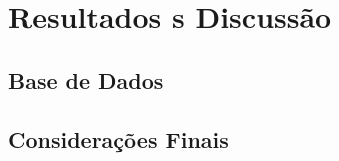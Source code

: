\chapter{Resultados s Discussão}\label{cap:resultados}

\lipsum[73]

\section{Base de Dados}

\lipsum[72]

\section{Considerações Finais}

\lipsum[74]